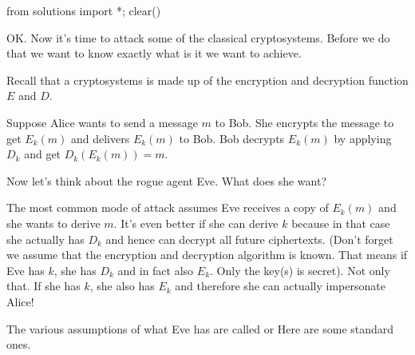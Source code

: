 \begin{python0}
from solutions import *; clear()
\end{python0}

OK. Now it's time to attack some of the classical cryptosystems.
Before we do that we want to know exactly what is it we want to
achieve.


Recall that a cryptosystems is made up of the encryption and
decryption function $E$ and $D$.

Suppose Alice wants to send a message $m$ to Bob. She encrypts the
message to get $E_k(m)$ and delivers $E_k(m)$ to Bob. Bob decrypts
$E_k(m)$ by applying $D_k$ and get $D_k(E_k(m)) = m$.

Now let's think about the rogue agent Eve. What does she want?

The most common mode of attack assumes Eve receives a copy of
$E_k(m)$ and she wants to derive $m$. It's even better if she can
derive $k$ because in that case she actually has $D_k$ and hence
can decrypt all future ciphertexts. (Don't forget we assume that
the encryption and decryption algorithm is known. That means if
Eve has $k$, she has $D_k$ and in fact also $E_k$. Only the key(s)
is secret). Not only that. If she has $k$, she also has $E_k$ and
therefore she can actually impersonate Alice!

The various assumptions of what Eve has are called
or
Here are some standard ones.

